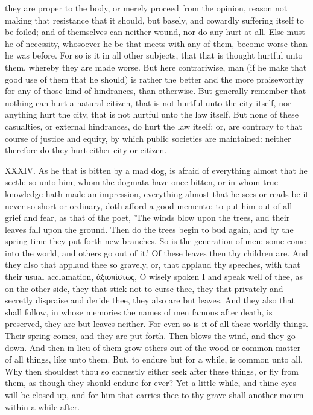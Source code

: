 they are proper to the body, or merely proceed from the opinion, reason
not making that resistance that it should, but basely, and cowardly
suffering itself to be foiled; and of themselves can neither wound, nor
do any hurt at all. Else must he of necessity, whosoever he be that meets
with any of them, become worse than he was before. For so is it in all
other subjects, that that is thought hurtful unto them, whereby they are
made worse. But here contrariwise, man (if he make that good use of them
that he should) is rather the better and the more praiseworthy for any of
those kind of hindrances, than otherwise. But generally remember that
nothing can hurt a natural citizen, that is not hurtful unto the city
itself, nor anything hurt the city, that is not hurtful unto the law
itself. But none of these casualties, or external hindrances, do hurt the
law itself; or, are contrary to that course of justice and equity, by
which public societies are maintained: neither therefore do they hurt
either city or citizen.

XXXIV. As he that is bitten by a mad dog, is afraid of everything almost
that he seeth: so unto him, whom the dogmata have once bitten, or in whom
true knowledge hath made an impression, everything almost that he sees or
reads be it never so short or ordinary, doth afford a good memento; to
put him out of all grief and fear, as that of the poet, 'The winds blow
upon the trees, and their leaves fall upon the ground. Then do the trees
begin to bud again, and by the spring-time they put forth new branches.
So is the generation of men; some come into the world, and others go out
of it.' Of these leaves then thy children are. And they also that applaud
thee so gravely, or, that applaud thy speeches, with that their usual
acclamation,
ἀξιοπίστως, O wisely
spoken I and speak well of thee, as on the other side, they that stick
not to curse thee, they that privately and secretly dispraise and deride
thee, they also are but leaves. And they also that shall follow, in whose
memories the names of men famous after death, is preserved, they are but
leaves neither. For even so is it of all these worldly things. Their
spring comes, and they are put forth. Then blows the wind, and they go
down. And then in lieu of them grow others out of the wood or common
matter of all things, like unto them. But, to endure but for a while, is
common unto all. Why then shouldest thou so earnestly either seek after
these things, or fly from them, as though they should endure for ever?
Yet a little while, and thine eyes will be closed up, and for him that
carries thee to thy grave shall another mourn within a while after.

